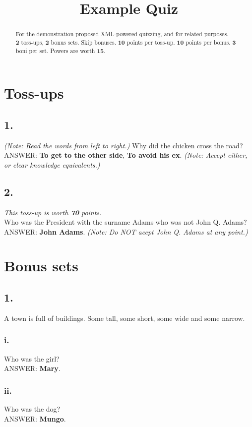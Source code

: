 \documentclass[12pt]{article}
\title{Example Quiz}
\begin{document}
\begin{abstract}
For the demonstration proposed XML-powered quizzing, and for related purposes. \\
\textbf{2} toss-ups, \textbf{2} bonus sets.  Skip bonuses.  \textbf{10} points per toss-up.  \textbf{10} points per bonus.  \textbf{3} boni per set.  Powers are worth \textbf{15}.\\
\end{abstract}
\maketitle
\section*{Toss-ups}

\subsection*{\textbf{1.}}
\textit{(Note: Read the words from left to right.)}  Why did the chicken cross the road? \\
ANSWER: 
\textbf{To get to the other side}, \textbf{To avoid his ex}.
\textit{(Note: Accept either, or clear knowledge equivalents.)}
\subsection*{\textbf{2.}} \textit{This toss-up is worth \textbf{70} points.}\\  Who was the President  with the surname Adams  who was not John Q. Adams? \\
ANSWER: 
\textbf{John Adams}.
\textit{(Note: Do NOT acept John Q. Adams at any point.)}
\section*{Bonus sets}

\subsection*{\textbf{1.}}
A town is full of buildings.  Some tall, some short, some wide and some narrow.
\subsubsection*{\textbf{i.}}
Who was the girl?\\
ANSWER: 
\textbf{Mary}.
\subsubsection*{\textbf{ii.}}
Who was the dog?\\
ANSWER: 
\textbf{Mungo}.
\end{document}
